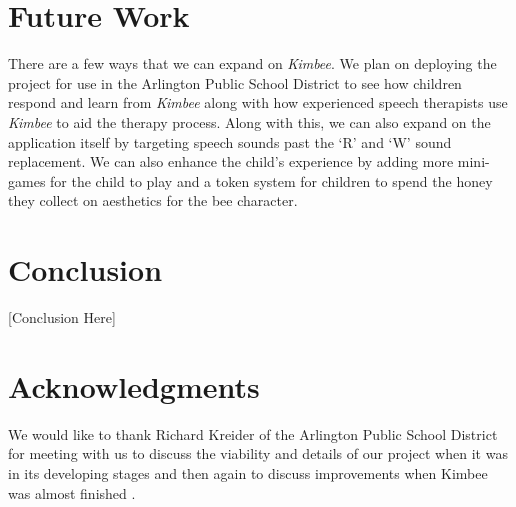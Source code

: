 \documentclass{sig-alternate-2013}
\begin{document}
\section{Future Work}

There are a few ways that we can expand on {\em Kimbee}. We plan on deploying the project for use in the Arlington Public School District to see how children respond and learn from {\em Kimbee} along with how experienced speech therapists use {\em Kimbee} to aid the therapy process. Along with this, we can also expand on the application itself by targeting speech sounds past the `R' and `W' sound replacement. We can also enhance the child's experience by adding more mini-games for the child to play and a token system for children to spend the honey they collect on aesthetics for the bee character.

\section{Conclusion}

[Conclusion Here]

\section{Acknowledgments}

We would like to thank Richard Kreider of the Arlington Public School District for meeting with us to discuss the viability and details of our project when it was in its developing stages and then again to discuss improvements when Kimbee was almost finished \cite{Kreider:Intro,Kreider:Results}.




\balancecolumns
\end{document}
